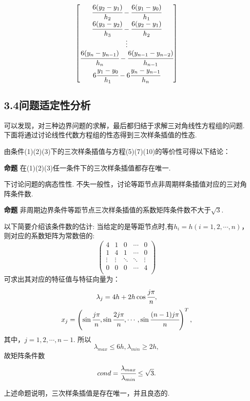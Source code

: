 \documentclass[12pt]{article}
\begin{document}
\begin{equation}\label{10}
\left[ \begin{matrix}
\cfrac{6(y_{2}-y_{1})}{h_{2}}-\cfrac{6(y_{1}-y_{0})}{h_{1}}\\
\cfrac{6(y_{3}-y_{2})}{h_{3}}-\cfrac{6(y_{2}-y_{1})}{h_{2}}\\
\vdots\\
\cfrac{6(y_{n}-y_{n-1})}{h_{n}}-\cfrac{6(y_{n-1}-y_{n-2})}{h_{n-1}}\\
6\cfrac{y_{1}-y_{0}}{h_{1}}-6\cfrac{y_{n}-y_{n-1}}{h_{n}}\\
\end{matrix} \right]
\end{equation}


\subsection*{{\normalsize 3.4}\quad\normalsize\heiti 问题适定性分析}
\par 可以发现，对三种边界问题的求解，最后都归结于求解三对角线性方程组的问题. 下面将通过讨论线性代数方程组的性态得到三次样条插值的性态.
\par 由条件(1)(2)(3)下的三次样条插值与方程(5)(7)(10)的等价性可得以下结论：
\par \textbf{命题} 
在(1)(2)(3)任一条件下的三次样条插值都存在唯一.
\par 下讨论问题的病态性性. 不失一般性，讨论等距节点非周期样条插值对应的三对角阵条件数.
\par \textbf{命题} 
非周期边界条件等距节点三次样条插值的系数矩阵条件数不大于$\sqrt{3}$.
\par 以下简要介绍该条件数的估计:
当给定的是等距节点时,有$h_{i}=h(i=1,2,\cdots,n)$，则对应的系数矩阵为常数倍的:
$$
\left(\begin{matrix}
4 & 1 & 0 & \cdots & 0\\
1 & 4 & 1 & \cdots & 0\\
\vdots & \vdots & \ddots & \ddots & \vdots\\
0 & 0 & 0 & \cdots & 4\\
\end{matrix}\right)
$$	
可求出其对应的特征值与特征向量为：
$$\lambda_{j}=4h+2h\cos \cfrac{j\pi}{n},$$ 
$$x_{j}=\left(\sin\cfrac{j\pi}{n},\sin\cfrac{2j\pi}{n},\cdots,\sin\cfrac{(n-1)j\pi}{n}\right)^{T}, $$
其中，$j = 1,2,\cdots,n-1$.
所以$$\lambda_{max}\leq6h,\lambda_{min}\geq2h,$$
故矩阵条件数
$$cond=\cfrac{\lambda_{max}}{\lambda_{min}}\leq\sqrt{3}.$$
\par 上述命题说明，三次样条插值是存在唯一，并且良态的.
\end{document}
